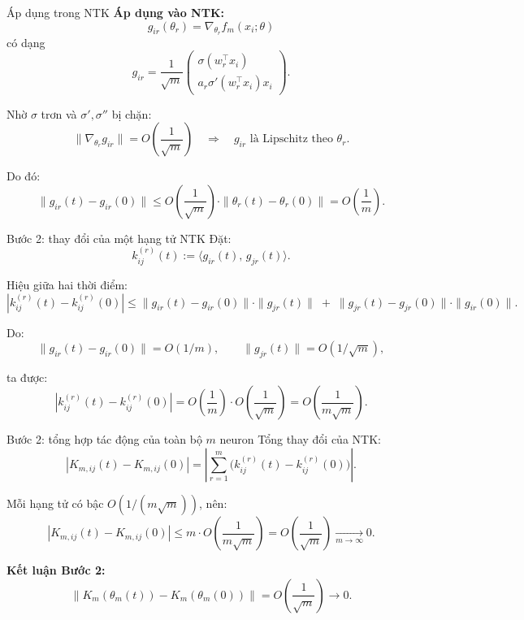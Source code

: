\begin{frame}{Áp dụng trong NTK}
\textbf{Áp dụng vào NTK:}
\[
g_{ir}(\theta_r)
= \nabla_{\theta_r} f_m(x_i;\theta)
\]
có dạng
\[
g_{ir} =
\frac{1}{\sqrt{m}}
\begin{pmatrix}
\sigma(w_r^\top x_i) \\
a_r \sigma'(w_r^\top x_i) x_i
\end{pmatrix}.
\]

Nhờ $\sigma$ trơn và $\sigma',\sigma''$ bị chặn:
\[
\|\nabla_{\theta_r} g_{ir}\| = O\!\left(\frac{1}{\sqrt{m}}\right)
\quad\Rightarrow\quad
g_{ir} \text{ là Lipschitz theo }\theta_r.
\]

Do đó:
\[
\|g_{ir}(t) - g_{ir}(0)\|
\le
O\!\left(\frac{1}{\sqrt{m}}\right)
\cdot
\|\theta_r(t)-\theta_r(0)\|
=
O\!\left(\frac{1}{m}\right).
\]
\end{frame}

\begin{frame}{Bước 2: thay đổi của một hạng tử NTK}
Đặt:
\[
  k_{ij}^{(r)}(t) := \langle g_{ir}(t),\, g_{jr}(t)\rangle.
\]

Hiệu giữa hai thời điểm:
\[
  |k_{ij}^{(r)}(t) - k_{ij}^{(r)}(0)|
  \le
  \|g_{ir}(t)-g_{ir}(0)\|\cdot \|g_{jr}(t)\|
  \;+\;
  \|g_{jr}(t)-g_{jr}(0)\|\cdot \|g_{ir}(0)\|.
\]

Do:
\[
  \|g_{ir}(t)-g_{ir}(0)\| = O(1/m), \qquad
  \|g_{jr}(t)\| = O(1/\sqrt{m}),
\]

ta được:
\[
  |k_{ij}^{(r)}(t) - k_{ij}^{(r)}(0)|
  = O\!\left(\frac{1}{m}\right)
    \cdot O\!\left(\frac{1}{\sqrt{m}}\right)
  = O\!\left(\frac{1}{m\sqrt{m}}\right).
\]
\end{frame}

\begin{frame}{Bước 2: tổng hợp tác động của toàn bộ $m$ neuron}
Tổng thay đổi của NTK:
\[
  |K_{m,ij}(t) - K_{m,ij}(0)|
  = \left|\sum_{r=1}^m \big(k_{ij}^{(r)}(t) - k_{ij}^{(r)}(0)\big)\right|.
\]

Mỗi hạng tử có bậc $O(1/(m\sqrt{m}))$, nên:
\[
  |K_{m,ij}(t) - K_{m,ij}(0)|
  \le
  m \cdot O\!\left(\frac{1}{m\sqrt{m}}\right)
  = O\!\left(\frac{1}{\sqrt{m}}\right)
  \xrightarrow[m\to\infty]{}
  0.
\]

\textbf{Kết luận Bước 2:}
\[
  \|K_m(\theta_m(t)) - K_m(\theta_m(0))\|
  = O\!\left(\frac{1}{\sqrt{m}}\right)
  \to 0.
\]
\end{frame}


